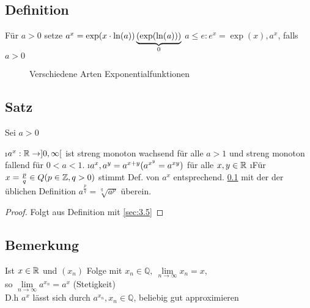 \subsection{Definition}\label{sec:5.18}
Für $a > 0$ setze $a^x = \exp(x \cdot \ln(a)) \underbrace{(\mathit{\exp(\ln(a))})}_0$
$a \leq e : e^x = \exp(x), a^x$, falls $a > 0$
\begin{figure}[h!]
\centering
{}
\caption{Verschiedene Arten Exponentialfunktionen}
\end{figure}
\subsection[Satz]{Satz}\label{sec:5.19}
Sei $a > 0$
\begin{enumerate}[a)]
\i $a^x: \mathbb{R} \to ]0,\infty[$ ist streng monoton wachsend für alle $a > 1$ und streng monoton fallend für $0 < a < 1$.
\i $a^x, a^y = a^{x+y}\\
(a^{x^{y}} = a^{xy})$ für alle $x,y \in \mathbb{R}$
\i Für $x = \frac{p}{q} \in Q (p \in \mathbb{Z}, q > 0)$ stimmt Def. von $a^x$ entsprechend. \ref{sec:5.18} mit der der üblichen Definition $a^{\frac{p}{q}} = \sqrt[q]{a^p}$ überein.
\begin{proof}
Folgt aus Definition mit \ref{sec:3.5}
\end{proof}
\end{enumerate}
\subsection{Bemerkung}
Ist $x \in \mathbb{R}$ und $(x_n)$ Folge mit $x_n \in \mathbb{Q},\ \lim\limits_{n \to \infty} x_n = x,$\\
so $\lim\limits_{n \to \infty} a^{x_n} = a^x$ \hfill(Stetigkeit)\\
D.h $a^x$ lässt sich durch $a^{x_n}, x_n \in \mathbb{Q}$, beliebig gut approximieren
